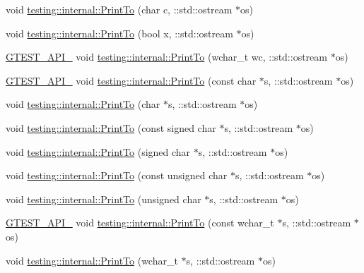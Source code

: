 \begin{DoxyCompactItemize}
void \hyperlink{namespacetesting_1_1internal_a476bd3d411d4f129620aaf8999c257c0}{testing\+::internal\+::\+Print\+To} (char c, \+::std\+::ostream $\ast$os)
\item 
void \hyperlink{namespacetesting_1_1internal_a2979ac1ad3e05c51dcd7dca2eb34e6ce}{testing\+::internal\+::\+Print\+To} (bool x, \+::std\+::ostream $\ast$os)
\item 
\hyperlink{gtest-port_8h_aa73be6f0ba4a7456180a94904ce17790}{G\+T\+E\+S\+T\+\_\+\+A\+P\+I\+\_\+} void \hyperlink{namespacetesting_1_1internal_a6c50fd437a2ae2ff6f182ccd6c2744dd}{testing\+::internal\+::\+Print\+To} (wchar\+\_\+t wc, \+::std\+::ostream $\ast$os)
\item 
\hyperlink{gtest-port_8h_aa73be6f0ba4a7456180a94904ce17790}{G\+T\+E\+S\+T\+\_\+\+A\+P\+I\+\_\+} void \hyperlink{namespacetesting_1_1internal_ac226053b96d7d61f9407e3b75bab07d9}{testing\+::internal\+::\+Print\+To} (const char $\ast$s, \+::std\+::ostream $\ast$os)
\item 
void \hyperlink{namespacetesting_1_1internal_a553eec7bb50de01c9e91cac4accc606f}{testing\+::internal\+::\+Print\+To} (char $\ast$s, \+::std\+::ostream $\ast$os)
\item 
void \hyperlink{namespacetesting_1_1internal_a792cc5665a34619ed7a6d54711433456}{testing\+::internal\+::\+Print\+To} (const signed char $\ast$s, \+::std\+::ostream $\ast$os)
\item 
void \hyperlink{namespacetesting_1_1internal_a1320096b116f8cc4b688acbd5b783051}{testing\+::internal\+::\+Print\+To} (signed char $\ast$s, \+::std\+::ostream $\ast$os)
\item 
void \hyperlink{namespacetesting_1_1internal_a42c591f2164ad105b502a9262333aed2}{testing\+::internal\+::\+Print\+To} (const unsigned char $\ast$s, \+::std\+::ostream $\ast$os)
\item 
void \hyperlink{namespacetesting_1_1internal_a7fae797c500d66d0f5a9db4f205e3416}{testing\+::internal\+::\+Print\+To} (unsigned char $\ast$s, \+::std\+::ostream $\ast$os)
\item 
\hyperlink{gtest-port_8h_aa73be6f0ba4a7456180a94904ce17790}{G\+T\+E\+S\+T\+\_\+\+A\+P\+I\+\_\+} void \hyperlink{namespacetesting_1_1internal_afb038075e9e2166d1d9158a19e0eed23}{testing\+::internal\+::\+Print\+To} (const wchar\+\_\+t $\ast$s, \+::std\+::ostream $\ast$os)
\item 
void \hyperlink{namespacetesting_1_1internal_a8d41baa371fad3eb5a3dbe1bbc02c290}{testing\+::internal\+::\+Print\+To} (wchar\+\_\+t $\ast$s, \+::std\+::ostream $\ast$os)
\item 

\end{DoxyCompactItemize}

